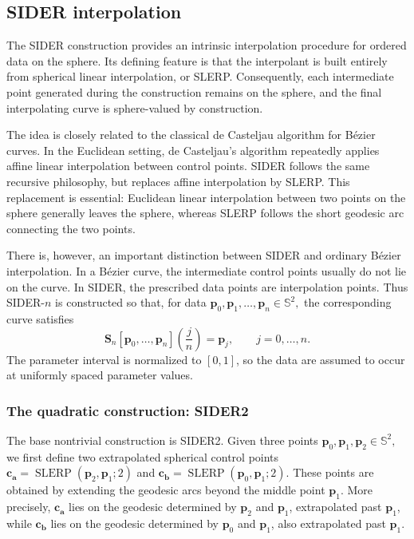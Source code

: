 \documentclass[a4paper,11pt]{article}
\newcommand{\bp}{\mathbf{p}}
\newcommand{\ba}{\mathbf{a}}
\newcommand{\bb}{\mathbf{b}}
\newcommand{\bc}{\mathbf{c}}
\numberwithin{equation}{section}
\theoremstyle{plain}
\theoremstyle{definition}
\theoremstyle{remark}
\newcommand{\Sph}{\mathbb{S}^2}
\newcommand{\slerp}{\operatorname{SLERP}}
\begin{document}
\subsection{SIDER interpolation}

The SIDER construction provides an intrinsic interpolation procedure for ordered data on the sphere.  Its defining feature is that the interpolant is built entirely from spherical linear interpolation, or SLERP.  Consequently, each intermediate point generated during the construction remains on the sphere, and the final interpolating curve is sphere-valued by construction.

The idea is closely related to the classical de Casteljau algorithm for B\'ezier curves.  In the Euclidean setting, de Casteljau's algorithm repeatedly applies affine linear interpolation between control points.  SIDER follows the same recursive philosophy, but replaces affine interpolation by SLERP.  This replacement is essential: Euclidean linear interpolation between two points on the sphere generally leaves the sphere, whereas SLERP follows the short geodesic arc connecting the two points.

There is, however, an important distinction between SIDER and ordinary B\'ezier interpolation.  In a B\'ezier curve, the intermediate control points usually do not lie on the curve.  In SIDER, the prescribed data points are interpolation points.  Thus SIDER-$n$ is constructed so that, for data
\(\bp_0,\bp_1,\ldots,\bp_n\in \Sph,\)
the corresponding curve satisfies
\[
        \mathbf{S}_n[\bp_0,\ldots,\bp_n]\!\left(\frac{j}{n}\right)=\bp_j,
        \qquad j=0,\ldots,n.
\]
The parameter interval is normalized to $[0,1]$, so the data are assumed to occur at uniformly spaced parameter values.

\subsubsection{The quadratic construction: SIDER2}

The base nontrivial construction is SIDER2.  Given three points
\(\bp_0,\bp_1,\bp_2\in \Sph,\)
we first define two extrapolated spherical control points
\(\bc_\ba=\slerp(\bp_2,\bp_1;2)\) and \(\bc_\bb=\slerp(\bp_0,\bp_1;2)\).
These points are obtained by extending the geodesic arcs beyond the middle point $\bp_1$.  More precisely, $\bc_\ba$ lies on the geodesic determined by $\bp_2$ and $\bp_1$, extrapolated past $\bp_1$, while $\bc_\bb$ lies on the geodesic determined by $\bp_0$ and $\bp_1$, also extrapolated past $\bp_1$.
\end{document}

